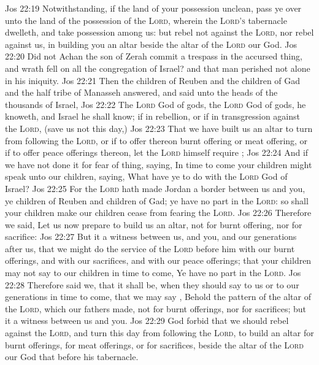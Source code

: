 \vs Jos 22:19 Notwithstanding, if the land of your possession  unclean,  pass ye over unto the land of the possession of the \textsc{Lord}, wherein the \textsc{Lord's} tabernacle dwelleth, and take possession among us: but rebel not against the \textsc{Lord}, nor rebel against us, in building you an altar beside the altar of the \textsc{Lord} our God.
\vs Jos 22:20 Did not Achan the son of Zerah commit a trespass in the accursed thing, and wrath fell on all the congregation of Israel? and that man perished not alone in his iniquity.
\vs Jos 22:21 Then the children of Reuben and the children of Gad and the half tribe of Manasseh answered, and said unto the heads of the thousands of Israel,
\vs Jos 22:22 The \textsc{Lord} God of gods, the \textsc{Lord} God of gods, he knoweth, and Israel he shall know; if  in rebellion, or if in transgression against the \textsc{Lord}, (save us not this day,)
\vs Jos 22:23 That we have built us an altar to turn from following the \textsc{Lord}, or if to offer thereon burnt offering or meat offering, or if to offer peace offerings thereon, let the \textsc{Lord} himself require ;
\vs Jos 22:24 And if we have not  done it for fear of  thing, saying, In time to come your children might speak unto our children, saying, What have ye to do with the \textsc{Lord} God of Israel?
\vs Jos 22:25 For the \textsc{Lord} hath made Jordan a border between us and you, ye children of Reuben and children of Gad; ye have no part in the \textsc{Lord}: so shall your children make our children cease from fearing the \textsc{Lord}.
\vs Jos 22:26 Therefore we said, Let us now prepare to build us an altar, not for burnt offering, nor for sacrifice:
\vs Jos 22:27 But  it  a witness between us, and you, and our generations after us, that we might do the service of the \textsc{Lord} before him with our burnt offerings, and with our sacrifices, and with our peace offerings; that your children may not say to our children in time to come, Ye have no part in the \textsc{Lord}.
\vs Jos 22:28 Therefore said we, that it shall be, when they should  say to us or to our generations in time to come, that we may say , Behold the pattern of the altar of the \textsc{Lord}, which our fathers made, not for burnt offerings, nor for sacrifices; but it  a witness between us and you.
\vs Jos 22:29 God forbid that we should rebel against the \textsc{Lord}, and turn this day from following the \textsc{Lord}, to build an altar for burnt offerings, for meat offerings, or for sacrifices, beside the altar of the \textsc{Lord} our God that  before his tabernacle.
